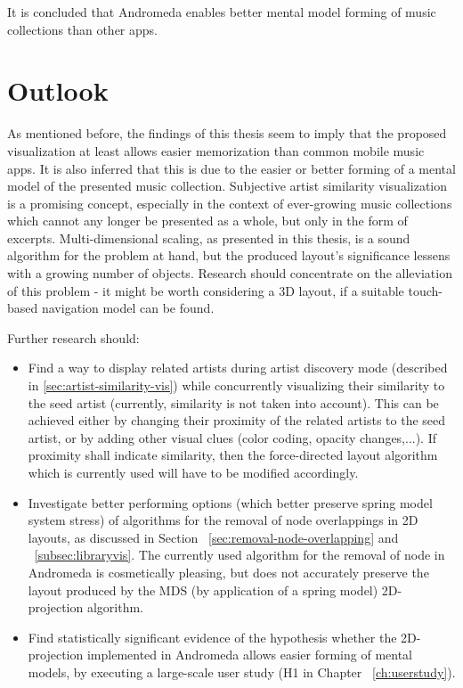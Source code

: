  It is concluded that Andromeda enables better mental model forming of music collections than other apps.

\section{Outlook}

As mentioned before, the findings of this thesis seem to imply that the proposed visualization at least allows easier memorization than common mobile music apps. It is also inferred that this is due to the easier or better forming of a mental model of the presented music collection. Subjective artist similarity visualization is a promising concept, especially in the context of ever-growing music collections which cannot any longer be presented as a whole, but only in the form of excerpts. Multi-dimensional scaling, as presented in this thesis, is a sound algorithm for the problem at hand, but the produced layout's significance lessens with a growing number of objects. Research should concentrate on the alleviation of this problem - it might be worth considering a 3D layout, if a suitable touch-based navigation model can be found.

Further research should:
\begin{itemize}
  \item Find a way to display related artists during artist discovery mode (described in \ref{sec:artist-similarity-vis}) while concurrently visualizing their similarity to the seed artist (currently, similarity is not taken into account). This can be achieved either by changing their proximity of the related artists to the seed artist, or by adding other visual clues (color coding, opacity changes,...). If proximity shall indicate similarity, then the force-directed layout algorithm which is currently used will have to be modified accordingly.

  \item Investigate better performing options (which better preserve spring model system stress) of algorithms for the removal of node overlappings in 2D layouts, as discussed in Section ~\ref{sec:removal-node-overlapping} and ~\ref{subsec:libraryvis}. The currently used algorithm for the removal of node in Andromeda is cosmetically pleasing, but does not accurately preserve the layout produced by the MDS (by application of a spring model) 2D-projection algorithm.

  \item Find statistically significant evidence of the hypothesis whether the 2D-projection implemented in Andromeda allows easier forming of mental models, by executing a large-scale user study (H1 in Chapter ~\ref{ch:userstudy}).
\end{itemize}